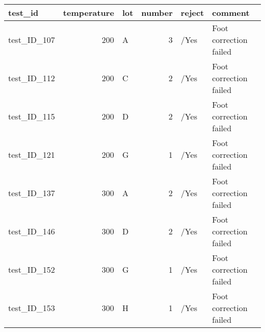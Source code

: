 \begin{tabular}{lrlrll}
\toprule
    test\_id &  temperature & lot &  number & reject &                comment \\
\midrule
test\_ID\_107 &          200 &   A &       3 &   /Yes & Foot correction failed \\
test\_ID\_112 &          200 &   C &       2 &   /Yes & Foot correction failed \\
test\_ID\_115 &          200 &   D &       2 &   /Yes & Foot correction failed \\
test\_ID\_121 &          200 &   G &       1 &   /Yes & Foot correction failed \\
test\_ID\_137 &          300 &   A &       2 &   /Yes & Foot correction failed \\
test\_ID\_146 &          300 &   D &       2 &   /Yes & Foot correction failed \\
test\_ID\_152 &          300 &   G &       1 &   /Yes & Foot correction failed \\
test\_ID\_153 &          300 &   H &       1 &   /Yes & Foot correction failed \\
\bottomrule
\end{tabular}
